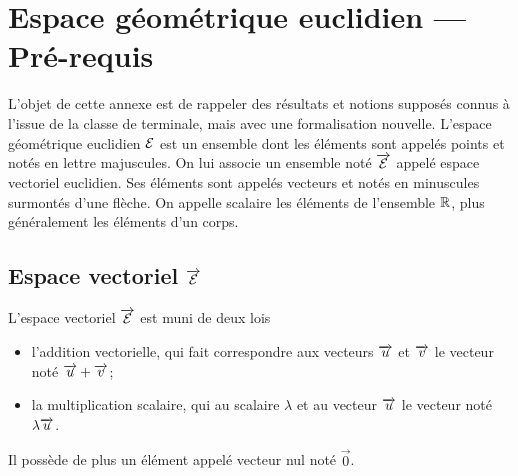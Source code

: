 \chapter{Espace géométrique euclidien --- Pré-requis}

L'objet de cette annexe est de rappeler des résultats et notions supposés 
connus à l'issue de la classe de terminale, mais avec une formalisation 
nouvelle. L'espace géométrique euclidien \(\mathcal{E}\) est un ensemble dont les 
éléments sont appelés points et notés en lettre majuscules. On lui associe un 
ensemble noté \(\overrightarrow{\mathcal{E}}\) appelé espace vectoriel euclidien. Ses éléments 
sont appelés vecteurs et notés en minuscules surmontés d'une flèche. On appelle 
scalaire les éléments de l'ensemble \(\mathbb{R}\), plus généralement les éléments d'un 
corps.

\section{Espace vectoriel \(\protect\overrightarrow{\mathcal{E}}\)}

L'espace vectoriel \(\overrightarrow{\mathcal{E}}\) est muni de deux lois
\begin{itemize}
  \item l'addition vectorielle, qui fait correspondre aux vecteurs \(\overrightarrow{u}\) et 
    \(\overrightarrow{v}\) le vecteur noté \(\overrightarrow{u} + \overrightarrow{v}\);
  \item la multiplication scalaire, qui au scalaire \(\lambda\) et au vecteur 
    \(\overrightarrow{u}\) le vecteur noté \(\lambda \overrightarrow{u}\).
\end{itemize}

Il possède de plus un élément appelé vecteur nul noté \(\vec{0}\).

